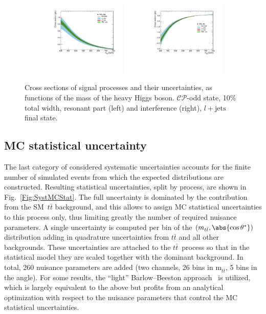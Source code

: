 \begin{figure}
  \centering
  \includegraphics[width=0.45\textwidth]{fig/chapt4/gen_plots/crossSectionUnc_res.pdf}
  \includegraphics[width=0.45\textwidth]{fig/chapt4/gen_plots/crossSectionUnc_int.pdf}
  \caption{Cross sections of signal processes and their uncertainties, as functions of the mass of the heavy Higgs boson. $\mathcal{CP}$-odd state, 10\% total width, resonant part (left) and interference (right), $l + \text{jets}$ final state.}
  \label{Fig:SgnCrossSectionUnc}
\end{figure}

\subsection{MC statistical uncertainty}
%
The last category of considered systematic uncertainties accounts for the finite number of simulated events from which the expected distributions are constructed.
Resulting statistical uncertainties, split by process, are shown in Fig.~\ref{Fig:SystMCStat}.
The full uncertainty is dominated by the contribution from the SM~$t\bar t$ background, and this allows to assign MC statistical uncertainties to this process only, thus limiting greatly the number of required nuisance parameters.
A single uncertainty is computed per bin of the $(m_{t\bar t}, \abs{\cos\theta^*})$ distribution adding in quadrature uncertainties from $t\bar t$ and all other backgrounds.
These uncertainties are attached to the $t\bar t$~process so that in the statistical model they are scaled together with the dominant background.
In total, 260 nuisance parameters are added (two channels, 26 bins in m$_{t\bar t}$, 5 bins in the angle).
For some results, the ``light'' Barlow--Beeston approach~\cite{Barlow:1993dm, Conway:2011in} is utilized, which is largely equivalent to the above but profits from an analytical optimization with respect to the nuisance parameters that control the MC statistical uncertainties.

